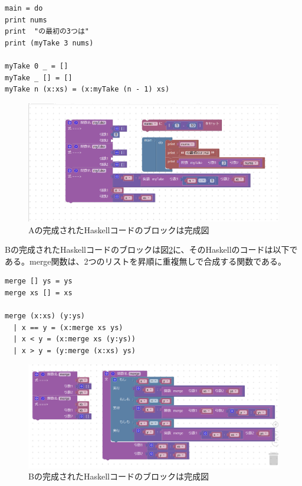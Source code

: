 \documentclass{risepaper}
\begin{document}
\begin{itemize}
\begin{lstlisting}[basicstyle=\ttfamily\footnotesize]
main = do
print nums
print  "の最初の3つは"
print (myTake 3 nums)

myTake 0 _ = []
myTake _ [] = []
myTake n (x:xs) = (x:myTake (n - 1) xs)
\end{lstlisting}

\begin{figure}[h]
\begin{center}
\includegraphics[scale=0.5]{img/haskell_experiment_result_a.PNG}
\caption{Aの完成されたHaskellコードのブロックは完成図}%
\label{fig:haskell_experiment_result_a}
\end{center}%
\end{figure}%

Bの完成されたHaskellコードのブロックは図\ref{fig:haskell_experiment_result_b}に、そのHaskellのコードは以下である。merge関数は、2つのリストを昇順に重複無しで合成する関数である。
\begin{lstlisting}[basicstyle=\ttfamily\footnotesize]
merge [] ys = ys
merge xs [] = xs

merge (x:xs) (y:ys)
  | x == y = (x:merge xs ys)
  | x < y = (x:merge xs (y:ys))
  | x > y = (y:merge (x:xs) ys)
\end{lstlisting}

\begin{figure}[h]
\begin{center}
\includegraphics[scale=0.5]{img/haskell_experiment_result_b.PNG}
\caption{Bの完成されたHaskellコードのブロックは完成図}%
\label{fig:haskell_experiment_result_b}
\end{center}%
\end{figure}%

\end{itemize} 
\end{document}
